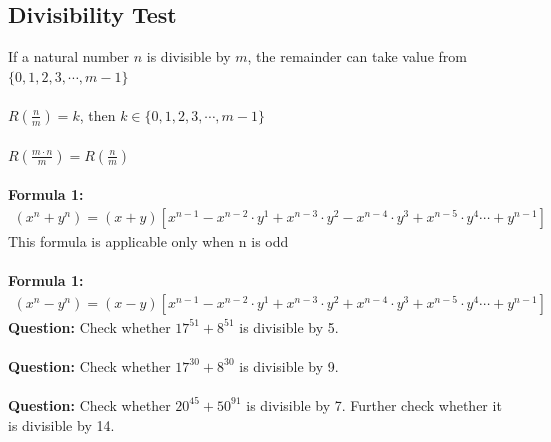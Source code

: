 \documentclass[12pt]{article}
\begin{document}
\subsection{Divisibility Test}
If a natural number $n$ is divisible by $m$, the remainder can take value from \\ $\{0,1,2,3, \cdots ,m-1\}$ \\
\\
$R \left(\frac{n}{m}\right) = k$, then $ k \in \{0,1,2,3, \cdots ,m-1\}$ \\
\\
$R \left(\frac{m\cdot n}{m}\right) = R \left(\frac{n}{m}\right)$ \\ 
\\
\textbf{Formula 1:}
\[
\begin{aligned}
    (x^n+y^n) = (x+y)\left[
        x^{n-1} - 
        x^{n-2} \cdot y^{1}+
        x^{n-3} \cdot y^{2}-
        x^{n-4} \cdot y^{3}+
        x^{n-5} \cdot y^{4}\cdots +
        y^{n-1}
        \right]
\end{aligned}
\]
This formula is applicable only when n is odd \\
\\
\textbf{Formula 1:}
\[
\begin{aligned}
    (x^n - y^n) = (x-y)\left[
        x^{n-1} - 
        x^{n-2} \cdot y^{1}+
        x^{n-3} \cdot y^{2}+
        x^{n-4} \cdot y^{3}+
        x^{n-5} \cdot y^{4}\cdots +
        y^{n-1}
        \right]
\end{aligned}
\]
\newpage
\noindent
\textbf{Question: }Check whether $17^{51}+8^{51}$ is divisible by 5. \\
\\
\textbf{Question: }Check whether $17^{30}+8^{30}$ is divisible by 9.
\\ 
\\
\textbf{Question: }Check whether $20^{45}+50^{91}$ is divisible by 7. Further check whether it is divisible by 14.
\end{document}
